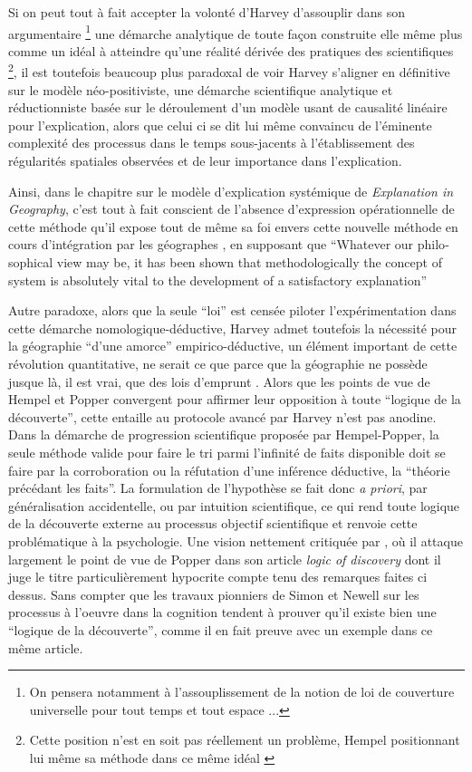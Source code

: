 Si on peut tout à fait accepter la volonté d'Harvey d'assouplir dans son argumentaire \footnote{On pensera notamment à l'assouplissement de la notion de loi de couverture universelle pour tout temps et tout espace ... } une démarche analytique de toute façon construite elle même plus comme un idéal à atteindre qu'une réalité dérivée des pratiques des scientifiques \footnote{Cette position n'est en soit pas réellement un problème, Hempel positionnant lui même sa méthode dans ce même idéal \autocite{Besse2000}}, il est toutefois beaucoup plus paradoxal de voir Harvey s'aligner en définitive sur le modèle néo-positiviste, une démarche scientifique analytique et réductionniste \autocite[57-59]{Paterson1984} basée sur le déroulement d'un modèle usant de causalité linéaire pour l'explication, alors que celui ci se dit lui même convaincu de l'éminente complexité des processus dans le temps sous-jacents à l'établissement des régularités spatiales observées et de leur importance dans l'explication.

Ainsi, dans le chapitre sur le modèle d'explication systémique de \textit{Explanation in Geography}, c'est tout à fait conscient de l'absence d'expression opérationnelle de cette méthode qu'il expose tout de même sa foi envers cette nouvelle méthode en cours d'intégration par les géographes \autocite[449,469]{Harvey1969}, en supposant que \foreignquote{english}{Whatever our philosophical view may be, it has been shown that methodologically the concept of system is absolutely vital to the development of a satisfactory explanation} \autocite[479]{Harvey1969}

Autre paradoxe, alors que la seule \enquote{loi} est censée piloter l’expérimentation dans cette démarche nomologique-déductive, Harvey admet toutefois la nécessité pour la géographie \enquote{d'une amorce} empirico-déductive, un élément important de cette révolution quantitative, ne serait ce que parce que la géographie ne possède jusque là, il est vrai, que des lois d'emprunt \autocite[41-42]{Harvey1969}. Alors que les points de vue de Hempel et Popper convergent pour affirmer leur opposition à toute \enquote{logique de la découverte}, cette entaille au protocole avancé par Harvey n'est pas anodine. Dans la démarche de progression scientifique proposée par Hempel-Popper, la seule méthode valide pour faire le tri parmi l'infinité de faits disponible doit se faire par la corroboration ou la réfutation d'une inférence déductive, la \enquote{théorie précédant les faits}. La formulation de l'hypothèse se fait donc \textit{a priori}, par généralisation accidentelle, ou par intuition scientifique, ce qui rend toute logique de la découverte externe au processus objectif scientifique et renvoie cette problématique à la psychologie. Une vision nettement critiquée par \textcite{Simon1973}, où il attaque largement le point de vue de Popper dans son article \textit{logic of discovery} dont il juge le titre particulièrement hypocrite compte tenu des remarques faites ci dessus. Sans compter que les travaux pionniers \autocite{Langley2004} de Simon et Newell \autocite{Newell1961} sur les processus à l'oeuvre dans la cognition tendent à prouver qu'il existe bien une \enquote{logique de la découverte}, comme il en fait preuve avec un exemple dans ce même article. 

